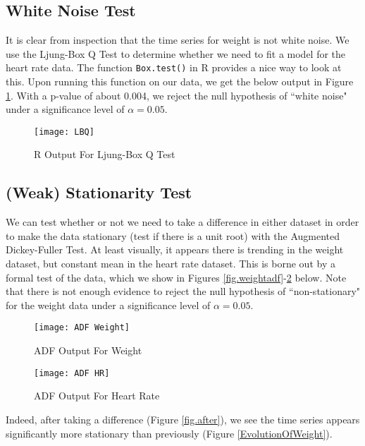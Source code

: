 \documentclass[12pt, letterpaper]{article}
\theoremstyle{definition}
\numberwithin{equation}{section}
\newcommand{\+}[1]{+_{\scalebox{.375}{#1}}}
\newcommand{\1}{\mathbbm{1}}
\begin{document}
\subsection{White Noise Test}
\label{subsection.whitenoise}
It is clear from inspection that the time series for weight is not white noise. We use the Ljung-Box Q Test to determine whether we need to fit a model for the heart rate data. The function \texttt{Box.test()} in R provides a nice way to look at this. Upon running this function on our data, we get the below output in Figure \ref{fig.ljungbox}. With a p-value of about 0.004, we reject the null hypothesis of ``white noise" under a significance level of $\alpha=0.05$.

\begin{figure}[H]
	\centering
	\texttt{[image: LBQ]}
	\caption{R Output For Ljung-Box Q Test}
	\label{fig.ljungbox}
\end{figure} 


\subsection{(Weak) Stationarity Test}
\label{subsection.stationary}
We can test whether or not we need to take a difference in either dataset in order to make the data stationary (test if there is a unit root) with the Augmented Dickey-Fuller Test. At least visually, it appears there is trending in the weight dataset, but constant mean in the heart rate dataset. This is borne out by a formal test of the data, which we show in Figures \ref{fig.weightadf}-\ref{fig.hradf} below. Note that there is not enough evidence to reject the null hypothesis of ``non-stationary" for the weight data under a significance level of $\alpha=0.05$.

\begin{figure}[H]
	\begin{minipage}[b]{0.48\textwidth}
		\centering
		\texttt{[image: ADF Weight]}
		\caption{ADF Output For Weight}
		\label{fig.weightadf}
	\end{minipage}
		\hfill
	\begin{minipage}[b]{0.48\textwidth}
		\centering
		\texttt{[image: ADF HR]}
		\caption{ADF Output For Heart Rate}
		\label{fig.hradf}
\end{minipage}
\end{figure} 

Indeed, after taking a difference (Figure \ref{fig.after}), we see the time series appears significantly more stationary than previously (Figure \ref{EvolutionOfWeight}).
\end{document}
